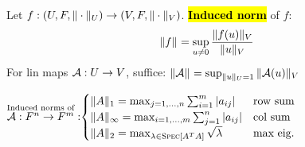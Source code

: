 \begin{Definition}
Let $f:(U,F,\|\cdot\|_{U})\to(V,F,\|\cdot\|_{V})$. \textbf{\hl{Induced norm}} of $f$:
\begin{equation*}
\|f\|_{}=\sup_{u\ne 0}\frac{\|f(u)\|_{V}}{\|u\|_{V}}
\end{equation*}
For lin maps $\mathcal{A}:U\to V$, suffice: $\|\mathcal{A}\|_{}=\sup_{\|u\|_{U}=1}\|\mathcal{A}(u)\|_{V}$
\end{Definition}
$
\overset{\text{Induced norms of}}{\mathcal{A}:F^n\to F^m}:\hspace{-1mm}
\begin{cases}
\|A\|_{1}=\max_{j=1,\ldots,n}\sum_{i=1}^m|a_{ij}| & \text{row sum} \\
\|A\|_{\infty}=\max_{i=1,\ldots,m}\sum_{j=1}^n|a_{ij}| & \text{col sum} \\
\|A\|_{2}=\max_{\lambda\in\textsc{Spec}[A^TA]}\sqrt{\lambda} & \text{max eig.}
\end{cases}
$

